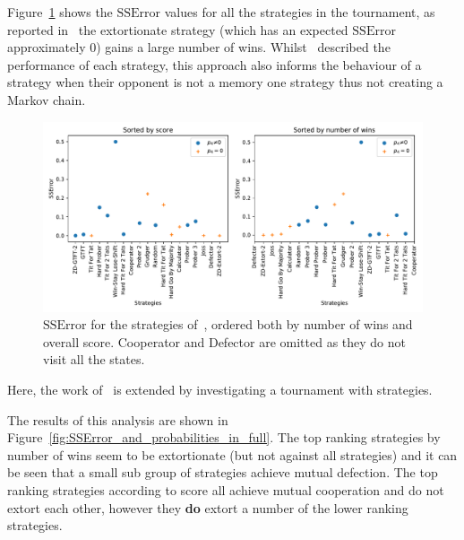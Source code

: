 \documentclass[a4paper]{article}
\begin{document}
Figure~\ref{fig:SSError_overall_in_stewart_plotkin} shows the \(\text{SSError}\)
values for all the strategies in the tournament, as reported
in~\cite{Stewart2012} the extortionate strategy (which has an expected
\(\text{SSError}\) approximately 0) gains a large number of wins.
Whilst~\cite{Stewart2012} described the performance of each strategy, this
approach also informs the behaviour of a strategy when their opponent is not a
memory one strategy thus not creating a Markov chain.

\begin{figure}[!htbp]
    \centering
    \includegraphics[width=.8\textwidth]{./assets/img/SSError_overall_in_stewart_plotkin/main.pdf}
    \caption{\(\text{SSError}\) for the strategies of~\cite{Stewart2012}, ordered both by
    number of wins and overall score. Cooperator and Defector are omitted as
    they do not visit all the states.}
    \label{fig:SSError_overall_in_stewart_plotkin}
\end{figure}

Here, the work of~\cite{Stewart2012} is extended by investigating a tournament
with 
strategies.

The results of this analysis are shown in
Figure~\ref{fig:SSError_and_probabilities_in_full}. The top ranking strategies
by number of wins seem to be extortionate (but not against all strategies) and
it can be seen that a small sub group of strategies achieve mutual defection.
The top ranking strategies according to score all achieve mutual cooperation and
do not extort each other, however they
\textbf{do} extort a number of the lower ranking strategies.
\end{document}
